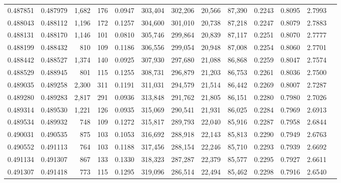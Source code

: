 \begin{tabular}{rrrrrrrrrrrrr}
0.487851 & 0.487979 & 1,682 &   176 &                                     0.0947 & 303,404 & 302,206 &  20,566 &  87,390 & 0.2243 & 0.8095 & 2.7993 \\
0.488043 & 0.488112 & 1,196 &   172 &                                     0.1257 & 304,600 & 301,010 &  20,738 &  87,218 & 0.2247 & 0.8079 & 2.7883 \\
0.488131 & 0.488170 & 1,146 &   101 &                                     0.0810 & 305,746 & 299,864 &  20,839 &  87,117 & 0.2251 & 0.8070 & 2.7777 \\
0.488199 & 0.488432 &   810 &   109 &                                     0.1186 & 306,556 & 299,054 &  20,948 &  87,008 & 0.2254 & 0.8060 & 2.7701 \\
0.488442 & 0.488527 & 1,374 &   140 &                                     0.0925 & 307,930 & 297,680 &  21,088 &  86,868 & 0.2259 & 0.8047 & 2.7574 \\
0.488529 & 0.488945 &   801 &   115 &                                     0.1255 & 308,731 & 296,879 &  21,203 &  86,753 & 0.2261 & 0.8036 & 2.7500 \\
0.489035 & 0.489258 & 2,300 &   311 &                                     0.1191 & 311,031 & 294,579 &  21,514 &  86,442 & 0.2269 & 0.8007 & 2.7287 \\
0.489280 & 0.489283 & 2,817 &   291 &                                     0.0936 & 313,848 & 291,762 &  21,805 &  86,151 & 0.2280 & 0.7980 & 2.7026 \\
0.489314 & 0.489530 & 1,221 &   126 &                                     0.0935 & 315,069 & 290,541 &  21,931 &  86,025 & 0.2284 & 0.7969 & 2.6913 \\
0.489534 & 0.489932 &   748 &   109 &                                     0.1272 & 315,817 & 289,793 &  22,040 &  85,916 & 0.2287 & 0.7958 & 2.6844 \\
0.490031 & 0.490535 &   875 &   103 &                                     0.1053 & 316,692 & 288,918 &  22,143 &  85,813 & 0.2290 & 0.7949 & 2.6763 \\
0.490552 & 0.491113 &   764 &   103 &                                     0.1188 & 317,456 & 288,154 &  22,246 &  85,710 & 0.2293 & 0.7939 & 2.6692 \\
0.491134 & 0.491307 &   867 &   133 &                                     0.1330 & 318,323 & 287,287 &  22,379 &  85,577 & 0.2295 & 0.7927 & 2.6611 \\
0.491307 & 0.491418 &   773 &   115 &                                     0.1295 & 319,096 & 286,514 &  22,494 &  85,462 & 0.2298 & 0.7916 & 2.6540 \\

\end{tabular}
